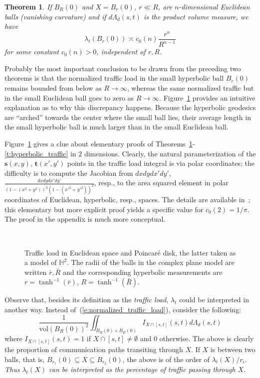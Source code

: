 \documentclass{article}
\newcommand{\s}{{\mathbf s}}
\renewcommand{\t}{{\mathbf t}}
\newcommand{\vol}{\mathrm{vol}}
\newtheorem{theorem}{Theorem}
\begin{document}
\begin{theorem}
\label{t:euclidean_traffic}
If $B_R(0)$ and $X=B_r(0)$, $r\ll R$, are $n$-dimensional Euclidean balls (vanishing curvature) 
and if $d\Lambda _{d} (s,t)$ is the product volume measure, 
we have 
$$\lambda _{t} (B_r(0))\asymp c_0(n)\frac{r^n}{R^{n-1}}$$ 
for some constant $c_0(n)>0$, independent of $r,R$. 
\end{theorem}

Probably the most important conclusion to be drawn from the preceding two theorems is that 
the normalized traffic load in the small hyperbolic ball $B_r(0)$ remains bounded from below as $R\to \infty $,  
whereas the same normalized traffic but in the small Euclidean ball goes to zero as $R\to \infty $. 
Figure~\ref{f:euclidean_poincare} provides an intuitive explanation as to why this discrepancy happens. 
Because the hyperbolic geodesics are ``arched'' towards the center where the small ball lies, 
their average length in the small hyperbolic ball is much larger than in the small Euclidean ball. 

Figure~\ref{f:euclidean_poincare} gives a clue about elementary proofs of Theorems~\ref{t:euclidean_traffic}-\ref{t:hyperbolic_traffic} in $2$ dimensions.
Clearly, the natural parameterization of the $\s(x,y)$, $\t(x',y')$ points in the traffic load integral is via polar coordinates; 
the difficulty is to compute the Jacobian from $dxdydx'dy'$, $\frac{dxdydx'dy'}{(1-(x^2+y^2))^2(1-(x'^2+y'^2))^2}$, resp.,  
to the area squared element in polar coordinates of Euclidean, hyperbolic, resp., spaces.  
The details are available in~\cite{mingjithesis}; this elementary but more explicit proof yields 
a specific value for $c_0(2)=1/\pi$. The proof in the appendix is much more conceptual. 


\begin{figure}[t]
\hskip-2cm\mbox{
}
\caption{Traffic load in Euclidean space and Poincar\'e disk, 
the latter taken as a model of $\mathbb{H}^2$. The radii of the balls 
in the complex plane model are written $\bar{r},\bar{R}$ and the corresponding hyperbolic measurements are 
$r=\tanh^{-1}(\bar{r})$, $R=\tanh^{-1}(\bar{R})$.}
\label{f:euclidean_poincare}
\end{figure}


Observe that, besides its definition as the {\it traffic load}, 
$\lambda_t$ could be interpreted in another way. 
Instead of~(\ref{e:normalized_traffic_load}), consider the following:
$$ \frac{1}{\vol(B_R(0))^2} \iint_{B_R(0) \times B_R(0)} 
         I_{X \cap [s,t]}(s,t) d\Lambda_d(s,t) $$
where $I_{X \cap [s,t]}(s,t)=1$ if $X \cap [s,t] \not= \emptyset$ and $0$ otherwise. 
The above is clearly the proportion of communication paths transiting through $X$. 
If $X$ is between two balls, that is, $B_{r_1}(0) \subseteq X \subseteq B_{r_2}(0)$, 
the above is of the order of $\lambda_t(X)/r_i$. 
{\it Thus $\lambda_t(X)$ can be interpreted as the percentage of traffic passing through $X$.} 
\end{document}
